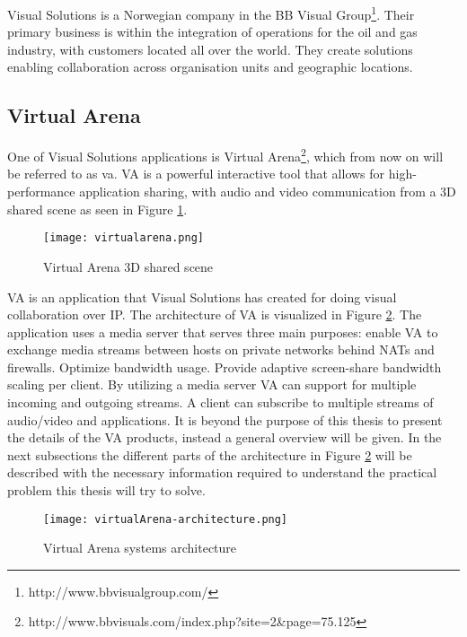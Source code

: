 Visual Solutions is a Norwegian company in the BB Visual Group\footnote{http://www.bbvisualgroup.com/}. Their primary business is within the integration of operations for the oil and gas industry, with customers located all over the world. They create solutions enabling collaboration across organisation units and geographic locations.

\subsection{Virtual Arena}
One of Visual Solutions applications is Virtual Arena\footnote{http://www.bbvisuals.com/index.php?site=2\&page=75.125}, which from now on will be referred to as \gls{va}. VA is a powerful interactive tool that allows for high-performance application sharing, with audio and video communication from a 3D shared scene as seen in Figure \ref{fig:vsva-3d-scene}.
\\
\begin{figure}[here]
\centerline{\texttt{[image: virtualarena.png]}}
\caption{Virtual Arena 3D shared scene}
\label{fig:vsva-3d-scene}
\end{figure}


VA is an application that Visual Solutions has created for doing visual collaboration over IP. The architecture of VA is visualized in Figure \ref{fig:vsva-architecture}. The application uses a media server that serves three main purposes: enable VA to exchange media streams between hosts on private networks behind NATs and firewalls. Optimize bandwidth usage. Provide adaptive screen-share bandwidth scaling per client. By utilizing a media server VA can support for multiple incoming and outgoing streams. A client can subscribe to multiple streams of audio/video and applications. It is beyond the purpose of this thesis to present the details of the VA products, instead a general overview will be given. In the next subsections the different parts of the architecture in Figure \ref{fig:vsva-architecture} will be described with the necessary information required to understand the practical problem this thesis will try to solve. 

\begin{figure}[here]
\centerline{\texttt{[image: virtualArena-architecture.png]}}
\caption{Virtual Arena systems architecture}
\label{fig:vsva-architecture}
\end{figure}

